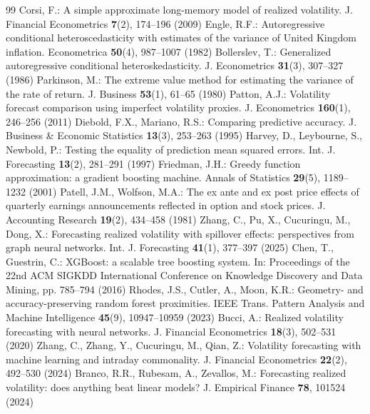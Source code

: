 \documentclass[runningheads,a4paper]{llncs}
\begin{document}
\begin{thebibliography}{99}
 Corsi, F.: A simple approximate long-memory model of realized volatility. J. Financial Econometrics \textbf{7}(2), 174--196 (2009)
 Engle, R.F.: Autoregressive conditional heteroscedasticity with estimates of the variance of United Kingdom inflation. Econometrica \textbf{50}(4), 987--1007 (1982)
 Bollerslev, T.: Generalized autoregressive conditional heteroskedasticity. J. Econometrics \textbf{31}(3), 307--327 (1986)
 Parkinson, M.: The extreme value method for estimating the variance of the rate of return. J. Business \textbf{53}(1), 61--65 (1980)
 Patton, A.J.: Volatility forecast comparison using imperfect volatility proxies. J. Econometrics \textbf{160}(1), 246--256 (2011)
 Diebold, F.X., Mariano, R.S.: Comparing predictive accuracy. J. Business \& Economic Statistics \textbf{13}(3), 253--263 (1995)
 Harvey, D., Leybourne, S., Newbold, P.: Testing the equality of prediction mean squared errors. Int. J. Forecasting \textbf{13}(2), 281--291 (1997)
 Friedman, J.H.: Greedy function approximation: a gradient boosting machine. Annals of Statistics \textbf{29}(5), 1189--1232 (2001)
 Patell, J.M., Wolfson, M.A.: The ex ante and ex post price effects of quarterly earnings announcements reflected in option and stock prices. J. Accounting Research \textbf{19}(2), 434--458 (1981)
 Zhang, C., Pu, X., Cucuringu, M., Dong, X.: Forecasting realized volatility with spillover effects: perspectives from graph neural networks. Int. J. Forecasting \textbf{41}(1), 377--397 (2025)
 Chen, T., Guestrin, C.: XGBoost: a scalable tree boosting system. In: Proceedings of the 22nd ACM SIGKDD International Conference on Knowledge Discovery and Data Mining, pp. 785--794 (2016)
 Rhodes, J.S., Cutler, A., Moon, K.R.: Geometry- and accuracy-preserving random forest proximities. IEEE Trans. Pattern Analysis and Machine Intelligence \textbf{45}(9), 10947--10959 (2023)
 Bucci, A.: Realized volatility forecasting with neural networks. J. Financial Econometrics \textbf{18}(3), 502--531 (2020)
 Zhang, C., Zhang, Y., Cucuringu, M., Qian, Z.: Volatility forecasting with machine learning and intraday commonality. J. Financial Econometrics \textbf{22}(2), 492--530 (2024)
 Branco, R.R., Rubesam, A., Zevallos, M.: Forecasting realized volatility: does anything beat linear models? J. Empirical Finance \textbf{78}, 101524 (2024)

\end{thebibliography}
\end{document}
